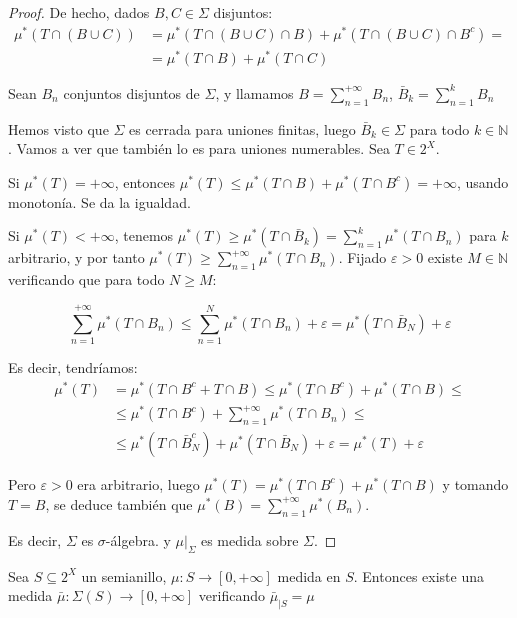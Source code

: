 \begin{proof}
 De hecho, dados $B,C \in \Sigma$ disjuntos:
 \begin{align*}
  \mu^\ast(T \cap (B\cup C)) &= \mu^\ast(T \cap(B\cup C) \cap B) + \mu^\ast(T \cap(B\cup C) \cap B^c) =\\
                             &= \mu^\ast(T \cap B) + \mu^\ast(T \cap C)
 \end{align*}

 Sean $B_n$ conjuntos disjuntos de $\Sigma$, y llamamos $B = \sum_{n=1}^{+\infty} B_n$, $\bar{B}_k = \sum_{n=1}^{k} B_n$
 
 Hemos visto que $\Sigma$ es cerrada para uniones finitas, luego $\bar{B}_k \in \Sigma$ para todo $k\in \mathbb{N}$.
 Vamos a ver que también lo es para uniones numerables. Sea $T\in 2^X$.

 Si $\mu^\ast(T) = +\infty$, entonces $\mu^\ast(T) \le \mu^\ast(T\cap B ) + \mu^\ast(T\cap B^c) = +\infty$, usando 
 monotonía. Se da la igualdad.
 
 Si $\mu^\ast(T) < +\infty$, tenemos $\mu^\ast(T) \ge \mu^\ast(T\cap \bar{B}_k) = \sum_{n=1}^k \mu^\ast(T\cap B_n)$
 para $k$ arbitrario, y por tanto $\mu^\ast(T) \ge \sum_{n=1}^{+\infty} \mu^\ast(T\cap B_n)$. Fijado $\varepsilon > 0$
 existe $M\in \mathbb{N}$ verificando que para todo $N\ge M$:
 
 \[\sum_{n=1}^{+\infty} \mu^\ast(T\cap B_n) \le \sum_{n=1}^N \mu^\ast(T\cap B_n) + \varepsilon = 
   \mu^\ast(T\cap \bar{B}_N) + \varepsilon\]
 
 Es decir, tendríamos:
 \begin{align*}
  \mu^\ast(T) &=   \mu^\ast(T\cap B^c + T\cap B) \le \mu^\ast(T\cap B^c) + \mu^\ast(T\cap B) \le \\
              &\le \mu^\ast(T\cap B^c) + \sum_{n=1}^{+\infty}\mu^\ast(T\cap B_n) \le \\
              &\le \mu^\ast(T\cap \bar{B}_N^c) + \mu^\ast(T\cap \bar{B}_N) + \varepsilon
                =  \mu^\ast(T) + \varepsilon
 \end{align*}

 Pero $\varepsilon > 0$ era arbitrario, luego $\mu^\ast(T) = \mu^\ast(T\cap B^c) + \mu^\ast(T\cap B)$ y tomando 
 $T=B$, se deduce también que $\mu^\ast(B) = \sum_{n=1}^{+\infty}\mu^\ast(B_n)$.
 
 Es decir, $\Sigma$ es $\sigma$-álgebra. y $\mu|_{\Sigma}$ es medida sobre $\Sigma$.
 
\end{proof}


\begin{theorem}
 Sea $S \subseteq 2^X$ un semianillo, $\mu:S \rightarrow [0,+\infty]$ medida en $S$. Entonces existe
 una medida $\bar{\mu}:\Sigma(S) \rightarrow [0,+\infty]$ verificando $\bar{\mu}_{|S} = \mu$
 \label{th:caratheodory}
\end{theorem}

